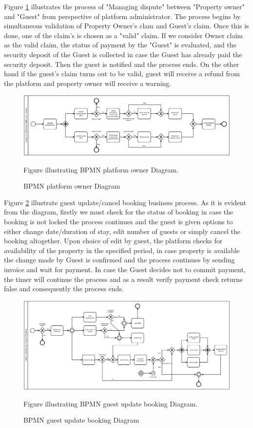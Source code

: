 Figure \ref{fig:bpm_platform_owner_model} illustrates the process of "Managing dispute" between "Property owner" and "Guest" from perspective of platform administrator. The process begins by simultaneous validation of Property Owner's clam and Guest's claim. Once this is done, one of the claim's is chosen as a "valid" claim. If we consider Owner claim as the valid claim, the status of payment by the "Guest" is evaluated, and the security deposit of the Guest is collected in case the Guest has already paid the security deposit. Then the guest is notified and the process ends. On the other hand if the guest's claim turns out to be valid, guest will receive a refund from the platform and property owner will receive a warning.

\begin{figure} 
\centering
\includegraphics[width=14cm]{pictures/BPMN_platform_owner.png}
\caption{BPMN platform owner Diagram}
Figure illustrating BPMN platform owner Diagram.
\label{fig:bpm_platform_owner_model}
\end{figure}

Figure \ref{fig:bpm_guest_update_model} illustrate guest update/cancel booking business process. As it is evident from the diagram, firstly we must check for the status of booking in case the booking is not locked the process continues and the guest is given options to either change date/duration of stay, edit number of guests or simply cancel the booking altogether. Upon choice of edit by guest, the platform checks for availability of the property in the specified period, in case property is available the change made by Guest is confirmed and the process continues by sending invoice and wait for payment. In case the Guest decides not to commit payment, the timer will continue the process and as a result verify payment check returns false and consequently the process ends.

\begin{figure} 
\centering
\includegraphics[width=14cm]{pictures/BPMN_guest_update.png}
\caption{BPMN guest update booking Diagram}
Figure illustrating BPMN guest update booking Diagram.
\label{fig:bpm_guest_update_model}
\end{figure}


